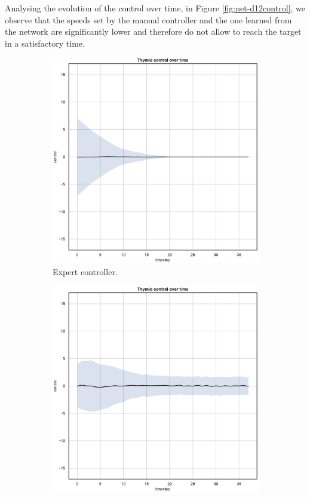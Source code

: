 Analysing the evolution of the control over time, in Figure 
\ref{fig:net-d12control}, we observe that the speeds set by the manual controller 
and the one learned from the network are significantly lower and therefore do 
not allow to reach the target in a satisfactory time.
\begin{figure}[!htb]
	\centering
	\begin{subfigure}[h]{0.3\textwidth}
		\centering
		\includegraphics[width=\textwidth]{contents/images/net-d12/control-overtime-omniscient}%
		\caption{Expert controller.}
	\end{subfigure}
	\hfill
	\begin{subfigure}[h]{0.3\textwidth}
		\centering
		\includegraphics[width=\textwidth]{contents/images/net-d12/control-overtime-manual}%

\end{subfigure}
\end{figure}
